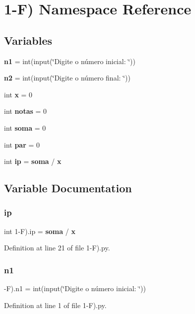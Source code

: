 \section{1-\/F) Namespace Reference}
\label{namespace1-_f_08}
\subsection*{Variables}
\begin{DoxyCompactItemize}
\item 
\textbf{ n1} = int(input(\char`\"{}Digite o número inicial\+: \char`\"{}))
\item 
\textbf{ n2} = int(input(\char`\"{}Digite o número final\+: \char`\"{}))
\item 
int \textbf{ x} = 0
\item 
int \textbf{ notas} = 0
\item 
int \textbf{ soma} = 0
\item 
int \textbf{ par} = 0
\item 
int \textbf{ ip} = \textbf{ soma} / \textbf{ x}
\end{DoxyCompactItemize}


\subsection{Variable Documentation}
\mbox{\label{namespace1-_f_08_a3a7ec0f9ebc6a9820e001031668479ca}} 
\subsubsection{ip}
{\footnotesize\ttfamily int 1-\/F).ip = \textbf{ soma} / \textbf{ x}}



Definition at line 21 of file 1-\/\+F).\+py.

\mbox{\label{namespace1-_f_08_a5d0b0017beb8f075e9685c3db48bddab}} 
\subsubsection{n1}
{\footnotesize{}-\/F).n1 = int(input(\char`\"{}Digite o número inicial\+: \char`\"{}))}



Definition at line 1 of file 1-\/\+F).\+py.

\mbox{\label{namespace1-_f_08_af411f62b8bce183b3d13ed14a9b0a788}} 

